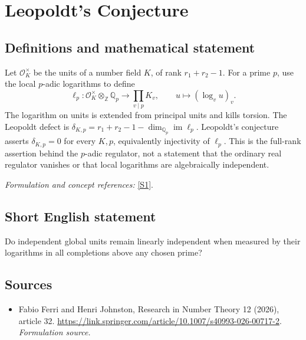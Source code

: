 \documentclass[11pt]{article}
\begin{document}
\section*{\texorpdfstring{Leopoldt's Conjecture}{Leopoldt's Conjecture}}\label{statement}
\subsection{Definitions and mathematical statement}
Let $\mathcal O_K^\times$ be the units of a number field $K$, of rank $r_1+r_2-1$. For a prime $p$, use the local $p$-adic logarithms to define
\[
 \ell_p:\mathcal O_K^\times\otimes_{{\mathbb{Z}}}{\mathbb{Q}}_p\longrightarrow\prod_{v\mid p}K_v,
 \qquad u\longmapsto(\log_v u)_v.
\]
The logarithm on units is extended from principal units and kills torsion. The Leopoldt defect is
$\delta_{K,p}=r_1+r_2-1-\dim_{{\mathbb{Q}}_p}\operatorname{im}\ell_p$.
Leopoldt's conjecture asserts $\delta_{K,p}=0$ for every $K,p$, equivalently injectivity of $\ell_p$. This is the full-rank assertion behind the $p$-adic regulator, not a statement that the ordinary real regulator vanishes or that local logarithms are algebraically independent.
\par\smallskip\textit{Formulation and concept references:} \href{https://link.springer.com/article/10.1007/s40993-026-00717-2}{[S1]}.

\subsection{Short English statement}
Do independent global units remain linearly independent when measured by their logarithms in all completions above any chosen prime?
\subsection{Sources}
\begin{itemize}
\item[S1]Fabio Ferri and Henri Johnston, Research in Number Theory 12 (2026), article 32.
\url{https://link.springer.com/article/10.1007/s40993-026-00717-2}.
\textit{Formulation source.}
\end{itemize}
\end{document}
